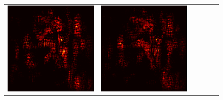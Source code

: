\documentclass[preprint,12pt]{elsarticle}
\begin{document}
\begin{figure}[p]
\begin{tabular}{cccccc}
  \includegraphics[scale=\scale]{../visualizations/examples/imagenette/cnn/active_saliency_map/3.png} & 
  \includegraphics[scale=\scale]{../visualizations/examples/imagenette/cnn/inactive_saliency_map/3.png} \\
  

\end{tabular}
\end{figure}
\end{document}
